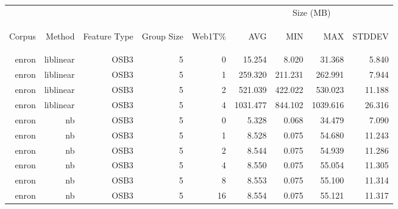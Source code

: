 	\begin{table}[htbp!]
	\begin{center}
		\begin{tabular}{ | r | r | r | r | r | r | r | r | r | }
			\hline
			 &  &  &  &  & \multicolumn{4}{|c|}{Size (MB)}\\ \cline{6-9}
			\begin{sideways}Corpus\end{sideways} & \begin{sideways}Method\end{sideways} & \begin{sideways}Feature Type\end{sideways} & \begin{sideways}Group Size\end{sideways} & \begin{sideways}Web1T\%\end{sideways} & \begin{sideways}AVG\end{sideways} & \begin{sideways}MIN\end{sideways} & \begin{sideways}MAX\end{sideways} & \begin{sideways}STDDEV\end{sideways}\\ \hline
		enron & liblinear & OSB3 & 5 & 0 & 15.254 & 8.020 & 31.368 & 5.840\\ \hline 
		enron & liblinear & OSB3 & 5 & 1 & 259.320 & 211.231 & 262.991 & 7.944\\ \hline 
		enron & liblinear & OSB3 & 5 & 2 & 521.039 & 422.022 & 530.023 & 11.188\\ \hline 
		enron & liblinear & OSB3 & 5 & 4 & 1031.477 & 844.102 & 1039.616 & 26.316\\ \hline 
		enron & nb & OSB3 & 5 & 0 & 5.328 & 0.068 & 34.479 & 7.090\\ \hline 
		enron & nb & OSB3 & 5 & 1 & 8.528 & 0.075 & 54.680 & 11.243\\ \hline 
		enron & nb & OSB3 & 5 & 2 & 8.544 & 0.075 & 54.939 & 11.286\\ \hline 
		enron & nb & OSB3 & 5 & 4 & 8.550 & 0.075 & 55.054 & 11.305\\ \hline 
		enron & nb & OSB3 & 5 & 8 & 8.553 & 0.075 & 55.100 & 11.314\\ \hline 
		enron & nb & OSB3 & 5 & 16 & 8.554 & 0.075 & 55.121 & 11.317\\ \hline 

\end{tabular}
\end{center}
\end{table}
